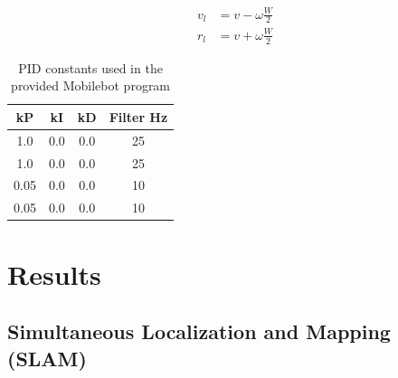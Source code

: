 \documentclass[journal]{IEEEtran}
\begin{document}
            \begin{equation} \label{eq:wheel_speeds}
                \begin{split}
                    v_l &= v - \omega\frac{W}{2} \\
                    r_l &= v + \omega\frac{W}{2}
                \end{split}
            \end{equation}
            
            \begin{table}[b!]
                \centering
                \begin{tabular}{|c|c|c|c|} \hline
                    kP & kI & kD & Filter Hz \\ \hline
                    1.0 & 0.0 & 0.0 & 25 \\ \hline
                    1.0 & 0.0 & 0.0 & 25 \\ \hline
                    0.05 & 0.0 & 0.0 & 10 \\ \hline
                    0.05 & 0.0 & 0.0 & 10 \\ \hline
                \end{tabular}
                \caption{PID constants used in the provided Mobilebot program}
                \label{tab:pid}
            \end{table}
    
\section{Results}

    \subsection{Simultaneous Localization and Mapping (SLAM)}
    
\end{document}
